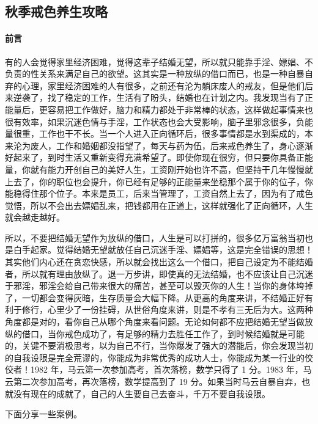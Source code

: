 \subsection{秋季戒色养生攻略}

\paragraph*{前言}

有的人会觉得家里经济困难，觉得这辈子结婚无望，所以就只能靠手淫、嫖娼、不负责的性关系来满足自己的欲望。这其实是一种放纵的借口而已，也是一种自暴自弃的心理，家里经济困难的人有很多，之前还有沦为躺床废人的戒友，但是他们后来逆袭了，找了稳定的工作，生活有了盼头，结婚也在计划之内。我发现当有了正能量后，更容易把工作做好，脑力和精力都处于非常棒的状态，这样做起事情来也很有效率，如果沉迷色情与手淫，工作状态也会大受影响，脑子里邪念很多，负能量很重，工作也干不长。当一个人进入正向循环后，很多事情都是水到渠成的，本来沦为废人，工作和婚姻都没指望了，每天与药为伍，后来戒色养生了，身心逐渐好起来了，到时生活又重新变得充满希望了。即使你现在很穷，但只要你具备正能量，你就有能力开创自己的美好人生，工资刚开始也许不高，但坚持干几年慢慢就上去了，你的职位也会提升，你已经有足够的正能量来坐稳那个属于你的位子，你能稳得住那个位子。本来是员工，后来当管理了，工资自然上去了，因为有了戒色觉悟，所以不会出去嫖娼乱来，把钱都用在正道上，这样就强化了正向循环，人生就会越走越好。

所以，不要把结婚无望作为放纵的借口，人生是可以打拼的，很多亿万富翁当初也是白手起家。觉得结婚无望就放任自己沉迷手淫、嫖娼等，这是完全错误的思想！其实他们内心还在贪恋快感，所以就会找出这么一个借口，把自己设定为不能结婚者，所以就有理由放纵了。退一万步讲，即使真的无法结婚，也不应该让自己沉迷于邪淫，邪淫会给自己带来很大的痛苦，甚至可以毁灭你的人生！当你的身体垮掉了，一切都会变得灰暗，生存质量会大幅下降。从更高的角度来讲，不结婚正好有利于修行，心里少了一份挂碍，从世俗角度来讲，则是不孝有三无后为大。这两种角度都是对的，看你自己从哪个角度来看问题。无论如何都不应把结婚无望当做放纵的借口，当你戒色成功了，有足够的精力去胜任工作了，到时候结婚就是可能的，关键不要消极思考，以为自己不行，当你爆发了强大的潜能后，你会发现当初的自我设限是完全荒谬的，你能成为非常优秀的成功人士，你能成为某一行业的佼佼者！1982 年，马云第一次参加高考，首次落榜，数学只得了 1 分。1983 年，马云第二次参加高考，再次落榜，数学提高到了 19 分。如果当时马云自暴自弃，也就没有现在的成就了，自己的人生要自己去奋斗，千万不要自我设限。

下面分享一些案例。

